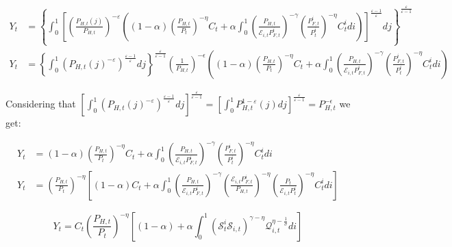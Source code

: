 \documentclass{article}
\begin{document}
\begin{equation}
    \label{}
    \begin{split}
    Y_{t} &= \left\{ \int^1_0 \left[ \left( \frac{P_{H,t}(j)}{P_{H,t}} \right)^{-\varepsilon} \left((1-\alpha) \left( \frac{P_{H,t}}{P_t} \right)^{-\eta} C_t +  \alpha \int_0^1 \left( \frac{P_{H,t}}{\mathcal{E}_{i,t} P^i_{F,t}} \right)^{-\gamma} \left( \frac{P^i_{F,t}}{P^i_{t}} \right)^{-\eta} C^i_t di \right)\right]^{\frac{\varepsilon-1}{\varepsilon}}dj \right\}^\frac{\varepsilon}{\varepsilon-1}\\
    Y_{t} &= \left\{ \int^1_0 \left( P_{H,t}(j)^{-\varepsilon} \right)^{\frac{\varepsilon-1}{\varepsilon}}dj \right\}^\frac{\varepsilon}{\varepsilon-1} \left(\frac{1}{P_{H,t}}\right)^{-\epsilon} \left((1-\alpha) \left( \frac{P_{H,t}}{P_t} \right)^{-\eta} C_t +  \alpha \int_0^1 \left( \frac{P_{H,t}}{\mathcal{E}_{i,t} P^i_{F,t}} \right)^{-\gamma} \left( \frac{P^i_{F,t}}{P^i_{t}} \right)^{-\eta} C^i_t di \right)
    \end{split}
\end{equation}


Considering that $\left[ \int^1_0 \left( P_{H,t}(j)^{-\varepsilon} \right)^{\frac{\varepsilon-1}{\varepsilon}}dj \right]^\frac{\varepsilon}{\varepsilon-1} = \left[ \int^1_0 P_{H,t}^{1-\varepsilon}(j)  dj \right]^\frac{\varepsilon}{\varepsilon-1} = P_{H,t}^{-\epsilon}$ we get:

\begin{equation}
    \begin{split}
        Y_{t} &= (1-\alpha) \left( \frac{P_{H,t}}{P_t} \right)^{-\eta} C_t +  \alpha \int_0^1 \left( \frac{P_{H,t}}{\mathcal{E}_{i,t} P^i_{F,t}} \right)^{-\gamma} \left( \frac{P^i_{F,t}}{P^i_{t}} \right)^{-\eta} C^i_t di \\
        Y_{t} &= \left( \frac{P_{H,t}}{P_t} \right)^{-\eta} \left[(1-\alpha)  C_t +  \alpha \int_0^1 \left( \frac{P_{H,t}}{\mathcal{E}_{i,t} P^i_{F,t}} \right)^{-\gamma}  \left( \frac{\mathcal{E}_{i,t} P^i_{F,t}}{P_{H,t}} \right)^{-\eta} \left(\frac{P_t}{\mathcal E_{i,t} P_t^i} \right)^{-\eta} C^i_t di \right]
    \end{split}
\end{equation}

\begin{equation}
    Y_{t} = C_t \left( \frac{P_{H,t}}{P_t} \right)^{-\eta} \left[(1-\alpha)  +  \alpha \int_0^1 \left(\mathcal S^i_t \mathcal S_{i,t} \right)^{\gamma - \eta} \mathcal Q^{\eta - \frac{1}{\sigma}}_{i,t} di \right] 
\end{equation}
\end{document}

